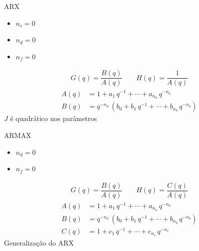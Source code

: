 \documentclass{beamer}
\newcommand{\Prod}{\,}
\renewcommand{\Prod}{\,}
\begin{document}
\begin{frame}{ARX}
  \begin{itemize}
    \item $n_c=0$
    \item $n_d=0$
    \item $n_f=0$
  \end{itemize}
  \begin{gather}
    G(q) = \dfrac{B(q)}{A(q)}
    \qquad
    H(q) = \dfrac{1}{A(q)}
  \end{gather}
  \begin{align}
    A(q) &= 1 + a_1 \Prod q^{-1} + \dotsb + a_{n_a} \Prod q^{-n_a}
    \\
    B(q) &= q^{-n_k} \Prod \left(b_0 + b_1 \Prod q^{-1} + \dotsb + b_{n_b} \Prod q^{-n_b}\right)
  \end{align}
  $J$ é quadrático nos parâmetros
\end{frame}

\begin{frame}{ARMAX}
  \begin{itemize}
    \item $n_d=0$
    \item $n_f=0$
  \end{itemize}
  \begin{gather}
    G(q) = \dfrac{B(q)}{A(q)}
    \qquad
    H(q) = \dfrac{C(q)}{A(q)}
  \end{gather}
  \begin{align}
    A(q) &= 1 + a_1 \Prod q^{-1} + \dotsb + a_{n_a} \Prod q^{-n_a}
    \\
    B(q) &= q^{-n_k} \Prod \left(b_0 + b_1 \Prod q^{-1} + \dotsb + b_{n_b} \Prod q^{-n_b}\right)
    \\
    C(q) &= 1 + c_1 \Prod q^{-1} + \dotsb + c_{n_c} \Prod q^{-n_c}
  \end{align}
  Generalização do ARX
\end{frame}
\end{document}

